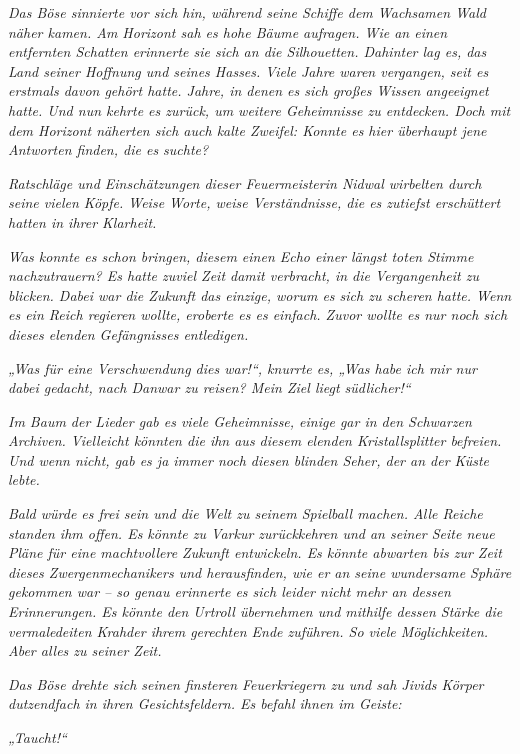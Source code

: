 \textit{Das Böse sinnierte vor sich hin, während seine Schiffe dem Wachsamen Wald näher kamen. Am Horizont sah es hohe Bäume aufragen. Wie an einen entfernten Schatten erinnerte sie sich an die Silhouetten. Dahinter lag es, das Land seiner Hoffnung und seines Hasses. Viele Jahre waren vergangen, seit es erstmals davon gehört hatte. Jahre, in denen es sich großes Wissen angeeignet hatte. Und nun kehrte es zurück, um weitere Geheimnisse zu entdecken. Doch mit dem Horizont näherten sich auch kalte Zweifel: Konnte es hier überhaupt jene Antworten finden, die es suchte?}

\textit{Ratschläge und Einschätzungen dieser Feuermeisterin Nidwal wirbelten durch seine vielen Köpfe. Weise Worte, weise Verständnisse, die es zutiefst erschüttert hatten in ihrer Klarheit.}

\textit{Was konnte es schon bringen, diesem einen Echo einer längst toten Stimme nachzutrauern? Es hatte zuviel Zeit damit verbracht, in die Vergangenheit zu blicken. Dabei war die Zukunft das einzige, worum es sich zu scheren hatte. Wenn es ein Reich regieren wollte, eroberte es es einfach. Zuvor wollte es nur noch sich dieses elenden Gefängnisses entledigen.}

\textit{„Was für eine Verschwendung dies war!“, knurrte es, „Was habe ich mir nur dabei gedacht, nach Danwar zu reisen? Mein Ziel liegt südlicher!“}

\textit{Im Baum der Lieder gab es viele Geheimnisse, einige gar in den Schwarzen Archiven. Vielleicht könnten die ihn aus diesem elenden Kristallsplitter befreien. Und wenn nicht, gab es ja immer noch diesen blinden Seher, der an der Küste lebte.}

\textit{Bald würde es frei sein und die Welt zu seinem Spielball machen. Alle Reiche standen ihm offen. Es könnte zu Varkur zurückkehren und an seiner Seite neue Pläne für eine machtvollere Zukunft entwickeln. Es könnte abwarten bis zur Zeit dieses Zwergenmechanikers und herausfinden, wie er an seine wundersame Sphäre gekommen war – so genau erinnerte es sich leider nicht mehr an dessen Erinnerungen. Es könnte den Urtroll übernehmen und mithilfe dessen Stärke die vermaledeiten Krahder ihrem gerechten Ende zuführen. So viele Möglichkeiten. Aber alles zu seiner Zeit.}

\textit{Das Böse drehte sich seinen finsteren Feuerkriegern zu und sah Jivids Körper dutzendfach in ihren Gesichtsfeldern. Es befahl ihnen im Geiste:}

\textit{„Taucht!“}



































